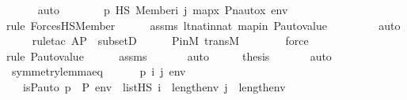 \begin{isabellebody}
\ \ \ \ \isamarkupfalse%
\ auto\isanewline
\ \ \isamarkupfalse%
\ \isamarkupfalse%
\ {\isachardoublequoteopen}{\isachardot}{\kern0pt}{\isachardot}{\kern0pt}{\isachardot}{\kern0pt}\ {\isasymlongleftrightarrow}\ {\isasympi}{\isacharbackquote}{\kern0pt}p\ {\isasymtturnstile}HS\ Member{\isacharparenleft}{\kern0pt}i{\isacharcomma}{\kern0pt}\ j{\isacharparenright}{\kern0pt}\ map{\isacharparenleft}{\kern0pt}{\isasymlambda}x{\isachardot}{\kern0pt}\ Pn{\isacharunderscore}{\kern0pt}auto{\isacharparenleft}{\kern0pt}{\isasympi}{\isacharparenright}{\kern0pt}{\isacharbackquote}{\kern0pt}x{\isacharcomma}{\kern0pt}\ env{\isacharparenright}{\kern0pt}{\isachardoublequoteclose}\isanewline
\ \ \ \ \isamarkupfalse%
{\isacharparenleft}{\kern0pt}rule\ ForcesHS{\isacharunderscore}{\kern0pt}Member{\isacharparenright}{\kern0pt}\isanewline
\ \ \ \ \isamarkupfalse%
\ assms\ lt{\isacharunderscore}{\kern0pt}nat{\isacharunderscore}{\kern0pt}in{\isacharunderscore}{\kern0pt}nat\ mapin\ P{\isacharunderscore}{\kern0pt}auto{\isacharunderscore}{\kern0pt}value\isanewline
\ \ \ \ \ \ \ \isamarkupfalse%
\ auto{\isacharbrackleft}{\kern0pt}{}{\isacharbrackright}{\kern0pt}\isanewline
\ \ \ \ \isamarkupfalse%
{\isacharparenleft}{\kern0pt}rule{\isacharunderscore}{\kern0pt}tac\ A{\isacharequal}{\kern0pt}P\ \ subsetD{\isacharparenright}{\kern0pt}\isanewline
\ \ \ \ \isamarkupfalse%
\ P{\isacharunderscore}{\kern0pt}in{\isacharunderscore}{\kern0pt}M\ transM\ \isanewline
\ \ \ \ \ \isamarkupfalse%
\ force\ \isanewline
\ \ \ \ \isamarkupfalse%
{\isacharparenleft}{\kern0pt}rule\ P{\isacharunderscore}{\kern0pt}auto{\isacharunderscore}{\kern0pt}value{\isacharparenright}{\kern0pt}\isanewline
\ \ \ \ \isamarkupfalse%
\ assms\ \isanewline
\ \ \ \ \isamarkupfalse%
\ auto\isanewline
\ \ \isamarkupfalse%
\ \isamarkupfalse%
\ {\isacharquery}{\kern0pt}thesis\ \isanewline
\ \ \ \ \isamarkupfalse%
\ auto\isanewline
{}\isamarkupfalse%
%
\endisatagproof
{\isafoldproof}%
%
\isadelimproof
\isanewline
%
\endisadelimproof
\isanewline
{}\isamarkupfalse%
\ symmetry{\isacharunderscore}{\kern0pt}lemma{\isacharunderscore}{\kern0pt}eq\ {\isacharcolon}{\kern0pt}\ \isanewline
\ \ \ {\isasympi}\ p\ i\ j\ env\isanewline
\ \ \ {\isachardoublequoteopen}is{\isacharunderscore}{\kern0pt}P{\isacharunderscore}{\kern0pt}auto{\isacharparenleft}{\kern0pt}{\isasympi}{\isacharparenright}{\kern0pt}{\isachardoublequoteclose}\ {\isachardoublequoteopen}p\ {\isasymin}\ P{\isachardoublequoteclose}\ {\isachardoublequoteopen}env\ {\isasymin}\ list{\isacharparenleft}{\kern0pt}HS{\isacharparenright}{\kern0pt}{\isachardoublequoteclose}\ {\isachardoublequoteopen}i\ {\isacharless}{\kern0pt}\ length{\isacharparenleft}{\kern0pt}env{\isacharparenright}{\kern0pt}{\isachardoublequoteclose}\ {\isachardoublequoteopen}j\ {\isacharless}{\kern0pt}\ length{\isacharparenleft}{\kern0pt}env{\isacharparenright}{\kern0pt}{\isachardoublequoteclose}\ \isanewline

\end{isabellebody}
